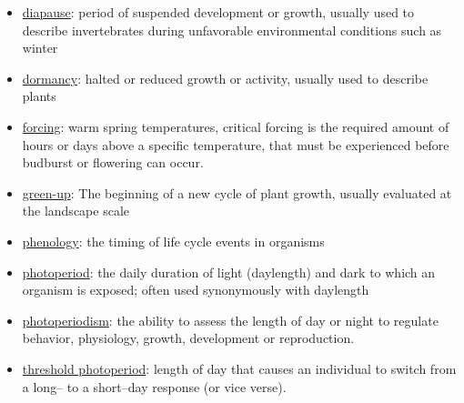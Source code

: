 \documentclass{article}
\begin{document}
\begin{itemize}
\item \underline{diapause}: period of suspended development or growth, usually used to describe invertebrates during unfavorable environmental conditions such as winter
\item \underline{dormancy}: halted or reduced growth or activity, usually used to describe plants
\item \underline{forcing}: warm spring temperatures, critical forcing is the required amount of hours or days above a specific temperature, that must be experienced before budburst or flowering can occur.
\item \underline{green-up}: The beginning of a new cycle of plant growth, usually evaluated at the landscape scale
\item \underline{phenology}: the timing of life cycle events in organisms
\item \underline{photoperiod}: the daily duration of light (daylength) and dark to which an organism is exposed; often used synonymously with daylength
\item \underline{photoperiodism}: the ability to assess the length of day or night to regulate behavior, physiology, growth, development or reproduction.
\item \underline{threshold photoperiod}: length of day that causes an individual to switch from a long-- to a short--day response (or vice verse).
\end{itemize}
\end{document}
